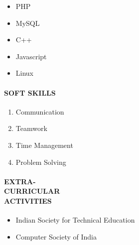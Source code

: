 \documentclass{article}
\begin{document}
\begin{itemize}
	\item PHP
	\item MySQL
	\item C++
	\item Javascript
	\item Linux
\end{itemize}
\paragraph{\textbf{SOFT SKILLS }}

\begin{enumerate}
	\item Communication
	\item Teamwork
	\item Time Management
	\item Problem Solving
\end{enumerate}
\paragraph{\textbf{EXTRA-\\CURRICULAR\\ACTIVITIES }}

\begin{itemize}
	\item Indian Society for Technical Education
	\item Computer Society of India
\end{itemize}
\end{document}
